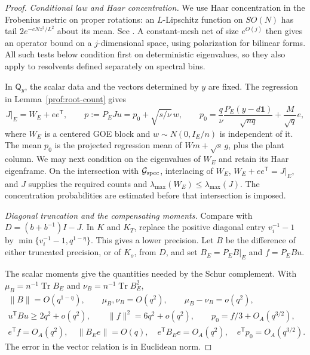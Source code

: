 \begin{proof}
\par\smallskip\noindent\textit{Conditional law and Haar concentration.}\enspace
We use Haar concentration in the Frobenius metric on proper rotations:
an $L$-Lipschitz function on $SO(N)$ has tail
$2e^{-cNz^2/L^2}$ about its mean. See
\cite[Sections~5.2--5.3, Proposition~5.13 and Theorem~5.16]{Meckes2019ClassicalGroups}.
A constant-mesh net of size $e^{O(j)}$ then gives an operator bound on
a $j$-dimensional space, using polarization for bilinear forms.
All such tests below condition first on deterministic eigenvalues,
so they also apply to resolvents defined separately on spectral bins.

In $\mathsf Q_y$, the scalar data and the vectors determined by $y$
are fixed. The regression in Lemma~\ref{prof:root-count} gives
\[
 J|_E=W_E+ee^{\mathsf T},\qquad
 p:=P_EJu=p_0+\sqrt{s/\nu}\,w,\qquad
 p_0=\frac{q}{\nu}\frac{P_E(y-d\mathbf1)}{\sqrt{nq}}
                   +\frac{M}{\sqrt q}e,
\]
where $W_E$ is a centered GOE block and $w\sim N(0,I_E/n)$ is
independent of it. The mean $p_0$ is the projected regression mean of
$Wm+\sqrt s\,g$, plus the plant column. We may next condition on the
eigenvalues of $W_E$ and retain its Haar eigenframe. On the intersection
with $\mathcal G_{\rm spec}$, interlacing of
$W_E$, $W_E+ee^{\mathsf T}=J|_E$, and $J$ supplies the required counts
and $\lambda_{\max}(W_E)\le\lambda_{\max}(J)$. The concentration
probabilities are estimated before that intersection is imposed.

\par\smallskip\noindent\textit{Diagonal truncation and the compensating moments.}\enspace
Compare with $D=(b+b^{-1})I-J$. In $K$ and $K_T$, replace the
positive diagonal entry $v_i^{-1}-1$ by
$\min\{v_i^{-1}-1,q^{1-\eta}\}$. This gives a lower precision.
Let $B$ be the difference of either truncated precision, or of $K_o$,
from $D$, and set $B_E=P_EB|_E$ and $f=P_EBu$.

The scalar moments give the quantities needed by the Schur complement.
With
$\mu_B=n^{-1}\operatorname{Tr}B_E$ and
$\nu_B=n^{-1}\operatorname{Tr}B_E^2$,
\[
 \begin{gathered}
 \|B\|=O(q^{1-\eta}),\qquad \mu_B,\nu_B=O(q^2),\qquad
 \mu_B-\nu_B=o(q^2),\\
 u^{\mathsf T}Bu\ge2q^2+o(q^2),\qquad
 \|f\|^2=6q^2+o(q^2),\qquad p_0=f/3+O_A(q^{3/2}),\\
 e^{\mathsf T}f=O_A(q^2),\quad \|B_Ee\|=O(q),\quad
 e^{\mathsf T}B_Ee=O_A(q^2),\quad e^{\mathsf T}p_0=O_A(q^{3/2}).
 \end{gathered}
\]
The error in the vector relation is in Euclidean norm.


\end{proof}
